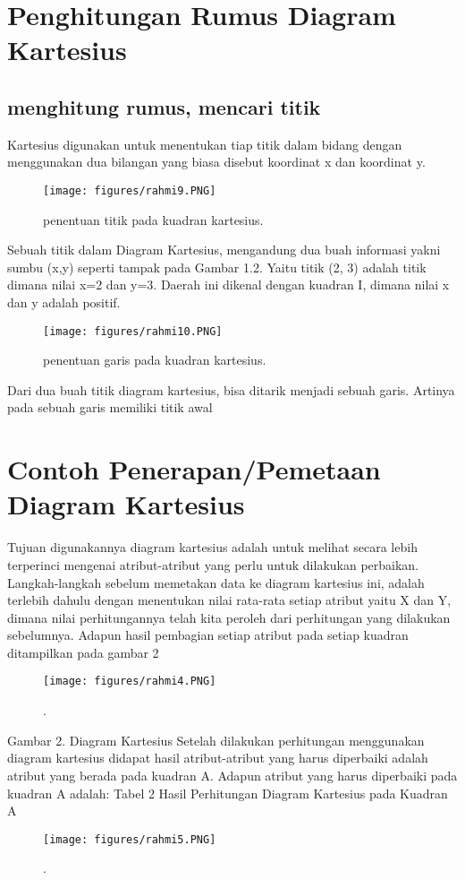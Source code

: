 \section{Penghitungan Rumus Diagram Kartesius}
\subsection{menghitung rumus, mencari titik}

Kartesius digunakan untuk menentukan tiap titik dalam bidang dengan menggunakan dua bilangan yang biasa disebut koordinat x dan koordinat y.
\begin{figure}[ht]
	\centerline{\texttt{[image: figures/rahmi9.PNG]}}
	\caption{penentuan titik pada kuadran kartesius.}
	\label{rahmi9}
	\end{figure}

Sebuah titik dalam Diagram Kartesius, mengandung dua buah informasi yakni sumbu (x,y) seperti tampak pada Gambar 1.2. 
Yaitu titik (2, 3) adalah titik dimana nilai x=2 dan y=3. Daerah ini dikenal dengan kuadran I, dimana nilai x dan y adalah positif.
\begin{figure}[ht]
	\centerline{\texttt{[image: figures/rahmi10.PNG]}}
	\caption{penentuan garis pada kuadran kartesius.}
	\label{rahmi10}
	\end{figure}

Dari dua buah titik diagram kartesius, bisa ditarik menjadi sebuah garis. Artinya pada sebuah garis memiliki titik awal


\section{Contoh Penerapan/Pemetaan Diagram Kartesius}
Tujuan digunakannya diagram kartesius adalah untuk melihat secara lebih terperinci mengenai atribut-atribut yang perlu untuk dilakukan perbaikan. 
Langkah-langkah sebelum memetakan data ke diagram kartesius ini, adalah terlebih dahulu dengan menentukan nilai rata-rata setiap atribut yaitu X dan Y, 
dimana nilai perhitungannya telah kita peroleh dari perhitungan yang dilakukan sebelumnya.
Adapun hasil pembagian setiap atribut pada setiap kuadran ditampilkan pada gambar 2
\begin{figure}[ht]
	\centerline{\texttt{[image: figures/rahmi4.PNG]}}
	\caption{.}
	\label{rahmi4}
	\end{figure}


Gambar 2. Diagram Kartesius
Setelah dilakukan perhitungan menggunakan diagram kartesius didapat hasil atribut-atribut yang harus diperbaiki adalah atribut yang berada pada kuadran A.
Adapun atribut yang harus diperbaiki pada kuadran A adalah:
Tabel 2 Hasil Perhitungan Diagram Kartesius pada Kuadran A	
\begin{figure}[ht]
	\centerline{\texttt{[image: figures/rahmi5.PNG]}}
	\caption{.}
	\label{rahmi5}
	\end{figure}


